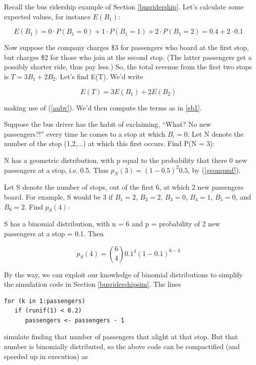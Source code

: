 Recall the bus ridership example of Section \ref{busridership}.  Let's
calculate some expected values, for instance $E(B_1)$:

\begin{equation}
\label{eb1}
E(B_1) =
0 \cdot P(B_1 = 0) +
1 \cdot P(B_1 = 1) +
2 \cdot P(B_1 = 2) = 0.4 + 2 \cdot 0.1
\end{equation}

Now suppose the company charges \$3 for passengers who board at the
first stop, but charges \$2 for those who join at the second stop.  (The
latter passengers get a possibly shorter ride, thus pay less.) So, the
total revenue from the first two stops is $T = 3 B_1 + 2 B_2$.  Let's
find E(T).  We'd write

\begin{equation}
E(T) = 3 E(B_1) + 2 E(B_2)
\end{equation}

making use of (\ref{aubv}).  We'd then compute the terms as in
\ref{eb1}.

Suppose the bus driver has the habit of exclaiming, ``What?  No new
passengers?!'' every time he comes to a stop at which $B_i = 0$.  Let N
denote the number of the stop (1,2,...) at which this first occurs.
Find P(N = 3):

N has a geometric distribution, with p equal to the probability that
there 0 new passengers at a stop, i.e. 0.5.  Thus $p_N(3) = (1-0.5)^2 0.5$,
by (\ref{geompmf}).

Let S denote the number of stops, out of the first 6, at which 2 new
passengers board.  For example, S would be 3 if $B_1 = 2$, $B_2 = 2$,
$B_3 = 0$, $B_4 = 1$, $B_5 = 0$, and $B_6 = 2$.  Find $p_S(4)$:

S has a binomial distribution, with n = 6 and p = probability
of 2 new passengers at a stop = 0.1.  Then

\begin{equation}
p_S(4) = \binom{6}{4} 0.1^4 (1-0.1)^{6-4}
\end{equation}

By the way, we can exploit our knowledge of binomial distributions to
simplify the simulation code in Section \ref{busridershipsim}.  The
lines

\begin{lstlisting}
for (k in 1:passengers)
   if (runif(1) < 0.2)
      passengers <- passengers - 1
\end{lstlisting}

simulate finding that number of passengers that alight at that stop.
But that number is binomially distributed, so the above code can be
compactified (and speeded up in execution) as

